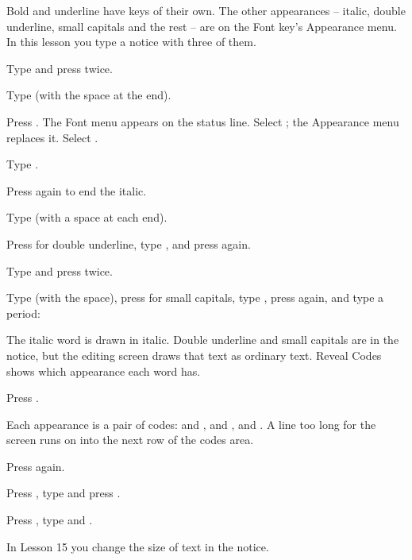 Bold and underline have keys of their own.  The other appearances -- italic,
double underline, small capitals and the rest -- are on the Font key's
Appearance menu.  In this lesson you type a notice with three of them.

\begin{WPSteps}
\item Type  and press 
twice.
\item Type  (with the space at the end).
\item Press .  The Font menu appears on the status line.
Select ; the Appearance menu replaces it.  Select
.
\item Type .
\item Press  again to end the italic.
\item Type  (with a space at each end).
\item Press  for double underline, type
, and press  again.
\item Type  and press 
twice.
\item Type  (with the space), press
 for small capitals, type ,
press  again, and type a period:
\end{WPSteps}
The italic word is drawn in italic.  Double underline and small capitals are
in the notice, but the editing screen draws that text as ordinary text.
Reveal Codes shows which appearance each word has.

\begin{WPSteps}
\item Press .
\end{WPSteps}
Each appearance is a pair of codes: \Code{[ITALC]} and \Code{[italc]},
 and , \Code{[SM CAP]} and \Code{[sm cap]}.
A line too long for the screen runs on into the next row of the codes area.
\begin{WPSteps}[resume]
\item Press  again.
\end{WPSteps}

\begin{WPSteps}[resume]
\item Press , type  and press
.
\item Press , type  and .
\end{WPSteps}
\EndReplay
In Lesson 15 you change the size of text in the notice.
